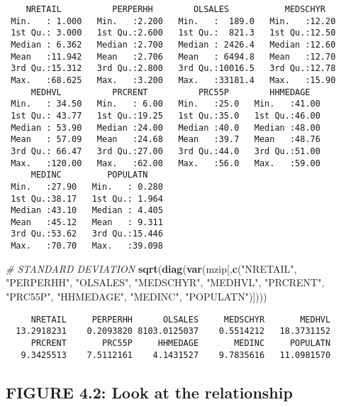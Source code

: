\documentclass[]{book}
\newenvironment{Shaded}{\begin{snugshade}}{\end{snugshade}}
\newcommand{\CommentTok}[1]{\textcolor[rgb]{0.56,0.35,0.01}{\textit{#1}}}
\newcommand{\KeywordTok}[1]{\textcolor[rgb]{0.13,0.29,0.53}{\textbf{#1}}}
\newcommand{\NormalTok}[1]{#1}
\newcommand{\StringTok}[1]{\textcolor[rgb]{0.31,0.60,0.02}{#1}}
\begin{document}
\begin{verbatim}
    NRETAIL          PERPERHH        OLSALES           MEDSCHYR    
 Min.   : 1.000   Min.   :2.200   Min.   :  189.0   Min.   :12.20  
 1st Qu.: 3.000   1st Qu.:2.600   1st Qu.:  821.3   1st Qu.:12.50  
 Median : 6.362   Median :2.700   Median : 2426.4   Median :12.60  
 Mean   :11.942   Mean   :2.706   Mean   : 6494.8   Mean   :12.70  
 3rd Qu.:15.312   3rd Qu.:2.800   3rd Qu.:10016.5   3rd Qu.:12.78  
 Max.   :68.625   Max.   :3.200   Max.   :33181.4   Max.   :15.90  
     MEDHVL          PRCRENT          PRC55P        HHMEDAGE    
 Min.   : 34.50   Min.   : 6.00   Min.   :25.0   Min.   :41.00  
 1st Qu.: 43.77   1st Qu.:19.25   1st Qu.:35.0   1st Qu.:46.00  
 Median : 53.90   Median :24.00   Median :40.0   Median :48.00  
 Mean   : 57.09   Mean   :24.68   Mean   :39.7   Mean   :48.76  
 3rd Qu.: 66.47   3rd Qu.:27.00   3rd Qu.:44.0   3rd Qu.:51.00  
 Max.   :120.00   Max.   :62.00   Max.   :56.0   Max.   :59.00  
     MEDINC         POPULATN     
 Min.   :27.90   Min.   : 0.280  
 1st Qu.:38.17   1st Qu.: 1.964  
 Median :43.10   Median : 4.405  
 Mean   :45.12   Mean   : 9.311  
 3rd Qu.:53.62   3rd Qu.:15.446  
 Max.   :70.70   Max.   :39.098  
\end{verbatim}

\begin{Shaded}
\begin{Highlighting}[]
\CommentTok{# STANDARD DEVIATION}
\KeywordTok{sqrt}\NormalTok{(}\KeywordTok{diag}\NormalTok{(}\KeywordTok{var}\NormalTok{(mzip[,}\KeywordTok{c}\NormalTok{(}\StringTok{"NRETAIL"}\NormalTok{, }\StringTok{"PERPERHH"}\NormalTok{, }\StringTok{"OLSALES"}\NormalTok{, }\StringTok{"MEDSCHYR"}\NormalTok{, }\StringTok{"MEDHVL"}\NormalTok{, }\StringTok{"PRCRENT"}\NormalTok{, }\StringTok{"PRC55P"}\NormalTok{, }\StringTok{"HHMEDAGE"}\NormalTok{, }\StringTok{"MEDINC"}\NormalTok{, }\StringTok{"POPULATN"}\NormalTok{)]))) }
\end{Highlighting}
\end{Shaded}

\begin{verbatim}
     NRETAIL     PERPERHH      OLSALES     MEDSCHYR       MEDHVL 
  13.2918231    0.2093820 8103.0125037    0.5514212   18.3731152 
     PRCRENT       PRC55P     HHMEDAGE       MEDINC     POPULATN 
   9.3425513    7.5112161    4.1431527    9.7835616   11.0981570 
\end{verbatim}

\hypertarget{figure-4.2-look-at-the-relationship}{%
\subsection{FIGURE 4.2: Look at the relationship}\label{figure-4.2-look-at-the-relationship}}
\end{document}
